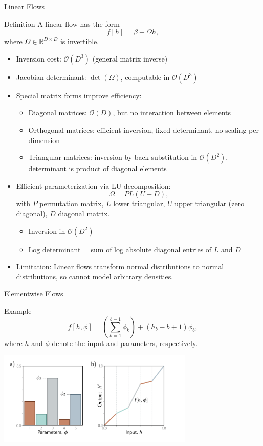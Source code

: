 \documentclass[aspectratio=169,xcolor=dvipsnames]{beamer}
\begin{document}
\begin{frame}{Linear Flows}
\begin{block}{Definition}
A linear flow has the form 
\[
f[h] = \beta + \Omega h,
\]
where \(\Omega \in \mathbb{R}^{D \times D}\) is invertible.
\end{block}

\begin{itemize}
  \item Inversion cost: \(\mathcal{O}(D^3)\) (general matrix inverse)
  \item Jacobian determinant: \(\det(\Omega)\), computable in \(\mathcal{O}(D^3)\)
  \item Special matrix forms improve efficiency:
    \begin{itemize}
      \item Diagonal matrices: \(\mathcal{O}(D)\), but no interaction between elements
      \item Orthogonal matrices: efficient inversion, fixed determinant, no scaling per dimension
      \item Triangular matrices: inversion by back-substitution in \(\mathcal{O}(D^2)\), determinant is product of diagonal elements
    \end{itemize}
  \item Efficient parameterization via LU decomposition:
  \[
  \Omega = P L (U + D),
  \]
  with \(P\) permutation matrix, \(L\) lower triangular, \(U\) upper triangular (zero diagonal), \(D\) diagonal matrix.
  \begin{itemize}
    \item Inversion in \(\mathcal{O}(D^2)\)
    \item Log determinant = sum of log absolute diagonal entries of \(L\) and \(D\)
  \end{itemize}
  \item Limitation: Linear flows transform normal distributions to normal distributions, so cannot model arbitrary densities.
\end{itemize}
\end{frame}

\begin{frame}{Elementwise Flows}
\begin{block}{Example}
\[
f[h, \phi] = \left(\sum_{k=1}^{b-1} \phi_k \right) + (h_b - b + 1) \phi_b,
\]
where \(h\) and \(\phi\) denote the input and parameters, respectively.
\end{block}
\vspace{0.4cm}
\centering
    \includegraphics[width=0.7\textwidth]{pictures/elementwiseflows.png}
\end{frame}
\end{document}
